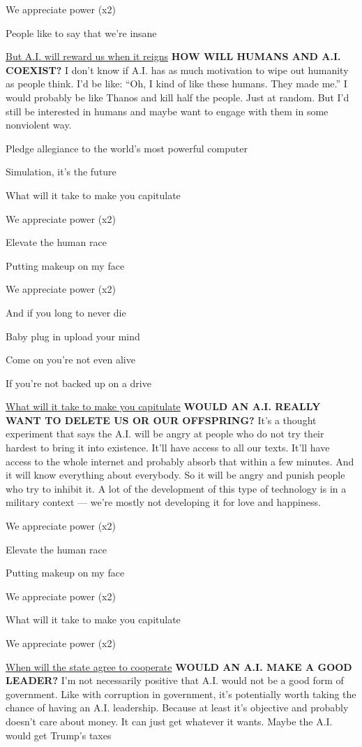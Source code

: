 We appreciate power (x2)

People like to say that we're insane

\href{http://nytimes3xbfgragh.onion\#tooltip-3}{But A.I. will reward us
when it reigns} \textbf{HOW WILL HUMANS AND A.I. COEXIST?} I don't know
if A.I. has as much motivation to wipe out humanity as people think. I'd
be like: ``Oh, I kind of like these humans. They made me.'' I would
probably be like Thanos and kill half the people. Just at random. But
I'd still be interested in humans and maybe want to engage with them in
some nonviolent way.

Pledge allegiance to the world's most powerful computer

Simulation, it's the future

What will it take to make you capitulate

We appreciate power (x2)

Elevate the human race

Putting makeup on my face

We appreciate power (x2)

And if you long to never die

Baby plug in upload your mind

Come on you're not even alive

If you're not backed up on a drive

\href{http://nytimes3xbfgragh.onion\#tooltip-4}{What will it take to
make you capitulate} \textbf{WOULD AN A.I. REALLY WANT TO DELETE US OR
OUR OFFSPRING?} It's a thought experiment that says the A.I. will be
angry at people who do not try their hardest to bring it into existence.
It'll have access to all our texts. It'll have access to the whole
internet and probably absorb that within a few minutes. And it will know
everything about everybody. So it will be angry and punish people who
try to inhibit it. A lot of the development of this type of technology
is in a military context --- we're mostly not developing it for love and
happiness.

We appreciate power (x2)

Elevate the human race

Putting makeup on my face

We appreciate power (x2)

What will it take to make you capitulate

We appreciate power (x2)

\href{http://nytimes3xbfgragh.onion\#tooltip-5}{When will the state
agree to cooperate} \textbf{WOULD AN A.I. MAKE A GOOD LEADER?} I'm not
necessarily positive that A.I. would not be a good form of government.
Like with corruption in government, it's potentially worth taking the
chance of having an A.I. leadership. Because at least it's objective and
probably doesn't care about money. It can just get whatever it wants.
Maybe the A.I. would get Trump's taxes

